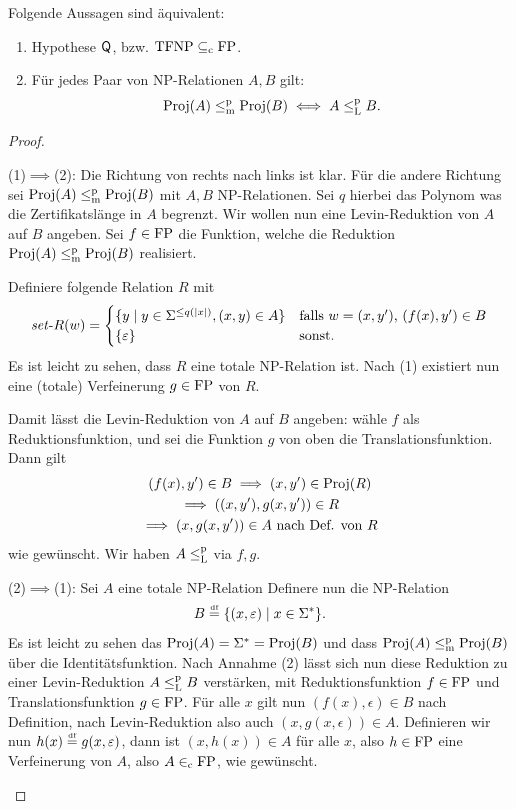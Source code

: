 \begin{theorem}\label{thm:q-as-levin}
    Folgende Aussagen sind äquivalent:
    \begin{enumerate}
        \item Hypothese $\mathsf{Q}$, bzw. $\mathrm{TFNP}\subseteq_\mathrm{c}\mathrm{FP}$. 
        \item Für jedes Paar von NP-Relationen $A, B$ gilt:
            \[ \operatorname{Proj}(A) \leq_\mathrm{m}^\mathrm{p} \operatorname{Proj}(B) \iff A \leq_\mathrm{L}^\mathrm{p} B. \]
    \end{enumerate}
\end{theorem}
\begin{proof}
    \begin{prooflist}[label={}]
\item (1)$\implies$(2): Die Richtung von rechts nach links ist klar. Für die andere Richtung sei $\operatorname{Proj}(A) \leq_\mathrm{m}^\mathrm{p} \operatorname{Proj}(B)$ mit $A,B$ NP-Relationen. Sei $q$ hierbei das Polynom was die Zertifikatslänge in $A$ begrenzt.
    Wir wollen nun eine Levin-Reduktion von $A$ auf $B$ angeben. Sei $f\in \mathrm{FP}$ die Funktion, welche die Reduktion $\operatorname{Proj}(A) \leq_\mathrm{m}^\mathrm{p} \operatorname{Proj}(B)$ realisiert.

    Definiere folgende Relation $R$ mit
    \[ \mathit{set}\text{-}{}R(w) = \begin{cases} \{ y\mid y\in\Sigma^{\leq q(|x|)}, (x,y)\in A \} & \text{falls $w=(x,y')$, $(f(x), y')\in B$} \\  \{\varepsilon\} & \text{sonst}. \end{cases} \]
    Es ist leicht zu sehen, dass $R$ eine totale NP-Relation ist. Nach (1) existiert nun eine (totale) Verfeinerung $g\in \mathrm{FP}$ von $R$.

    Damit lässt die Levin-Reduktion von $A$ auf $B$ angeben: wähle $f$ als Reduktionsfunktion, und sei die Funktion $g$ von oben die Translationsfunktion. Dann gilt
    \begin{gather*}
        (f(x), y') \in B \implies (x, y')\in\operatorname{Proj}(R) \\
        \implies ((x, y'), g(x, y'))\in R\\
        \implies (x, g(x, y')) \in A \text{ nach Def. von $R$}
    \end{gather*}
    wie gewünscht. Wir haben $A\leq_\mathrm{L}^\mathrm{p}$ via $f, g$.
\item (2)$\implies$(1): Sei $A$ eine totale NP-Relation
    Definere nun die NP-Relation
    \[ B \stackrel{\text{\smash{\tiny df}}}{=} \{ (x, \varepsilon) \mid x\in\Sigma^* \}. \]
    Es ist leicht zu sehen das $\operatorname{Proj}(A)=\Sigma^*=\operatorname{Proj}(B)$ und dass $\operatorname{Proj}(A)\leq_\mathrm{m}^\mathrm{p}\operatorname{Proj}(B)$ über die Identitätsfunktion.
    Nach Annahme (2) lässt sich nun diese Reduktion zu einer Levin-Reduktion $A\leq_\mathrm{L}^\mathrm{p} B$ verstärken, mit Reduktionsfunktion $f\in\mathrm{FP}$ und  Translationsfunktion $g\in\mathrm{FP}$.
    Für alle $x$ gilt nun $(f(x),\epsilon)\in B$ nach Definition,
    nach Levin-Reduktion also auch $(x, g(x, \epsilon))\in A$.
    Definieren wir nun $h(x)\stackrel{\text{\smash{\tiny df}}}{=} g(x,\varepsilon)$, dann ist $(x, h(x))\in A$ für alle $x$, also $h\in\mathrm{FP}$ eine Verfeinerung von $A$, also $A\in_\mathrm{c} \mathrm{FP}$, wie gewünscht.
\end{prooflist}
\end{proof}

